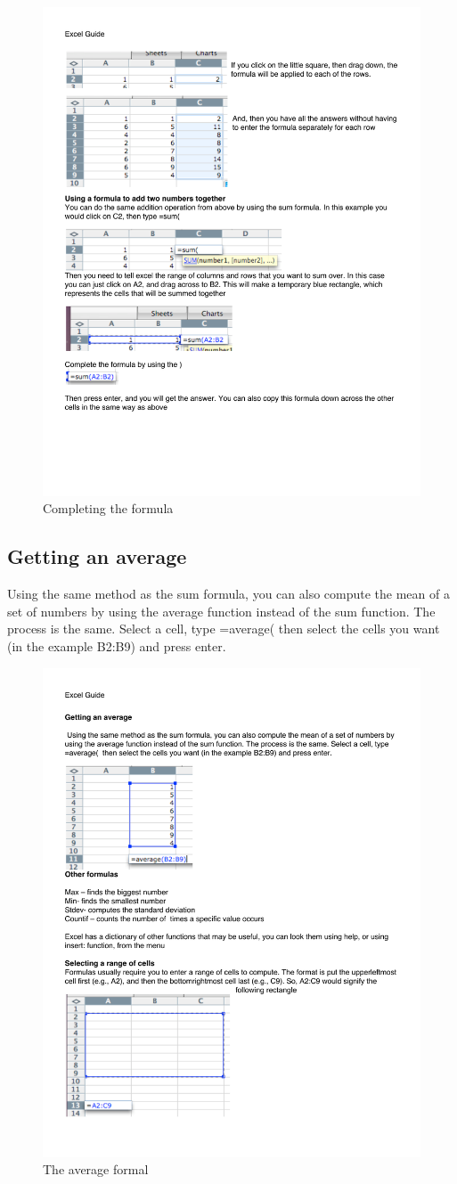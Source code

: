 \begin{figure}
      \includegraphics[width=.5\linewidth]{LabmanualFigures/Excel7.pdf}
      \caption{Completing the formula}
      \label{fig:excel7}
\end{figure}    

\subsection{Getting an average}

Using the same method as the sum formula, you can also compute the mean of a set of numbers by using the average function instead of the sum function. The process is the same. Select a cell, type =average( then select the cells you want (in the example B2:B9) and press enter.

\begin{figure}
      \includegraphics[width=.5\linewidth]{LabmanualFigures/Excel8.pdf}
      \caption{The average formal}
      \label{fig:excel8}
\end{figure}

